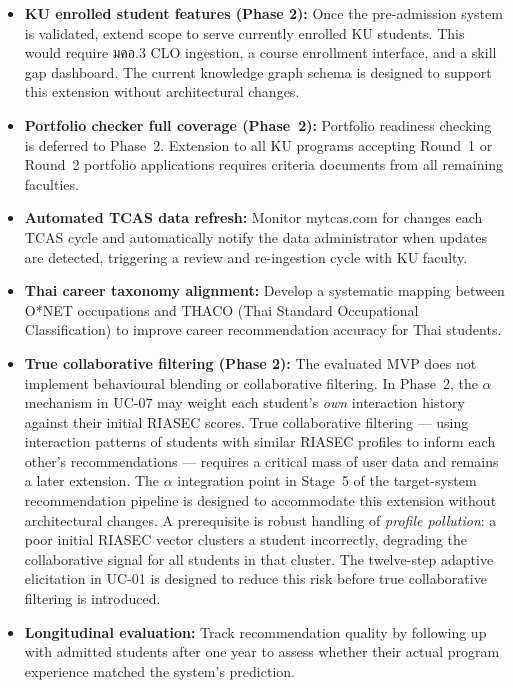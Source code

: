 \begin{itemize}[leftmargin=80pt]
    \item \textbf{KU enrolled student features (Phase 2):} Once the pre-admission system is validated, extend scope to serve currently enrolled KU students. This would require มคอ.3 CLO ingestion, a course enrollment interface, and a skill gap dashboard. The current knowledge graph schema is designed to support this extension without architectural changes.

    \item \textbf{Portfolio checker full coverage (Phase~2):} Portfolio readiness checking is deferred to Phase~2. Extension to all KU programs accepting Round~1 or Round~2 portfolio applications requires criteria documents from all remaining faculties.

    \item \textbf{Automated TCAS data refresh:} Monitor mytcas.com for changes each TCAS cycle and automatically notify the data administrator when updates are detected, triggering a review and re-ingestion cycle with KU faculty.

    \item \textbf{Thai career taxonomy alignment:} Develop a systematic mapping between O*NET occupations and THACO (Thai Standard Occupational Classification) to improve career recommendation accuracy for Thai students.

    \item \textbf{True collaborative filtering (Phase 2):} The evaluated MVP does not implement behavioural blending or collaborative filtering. In Phase~2, the $\alpha$ mechanism in UC-07 may weight each student's \textit{own} interaction history against their initial RIASEC scores. True collaborative filtering --- using interaction patterns of students with similar RIASEC profiles to inform each other's recommendations --- requires a critical mass of user data and remains a later extension. The $\alpha$ integration point in Stage~5 of the target-system recommendation pipeline is designed to accommodate this extension without architectural changes. A prerequisite is robust handling of \textit{profile pollution}: a poor initial RIASEC vector clusters a student incorrectly, degrading the collaborative signal for all students in that cluster. The twelve-step adaptive elicitation in UC-01 is designed to reduce this risk before true collaborative filtering is introduced.

    \item \textbf{Longitudinal evaluation:} Track recommendation quality by following up with admitted students after one year to assess whether their actual program experience matched the system's prediction.
\end{itemize}
